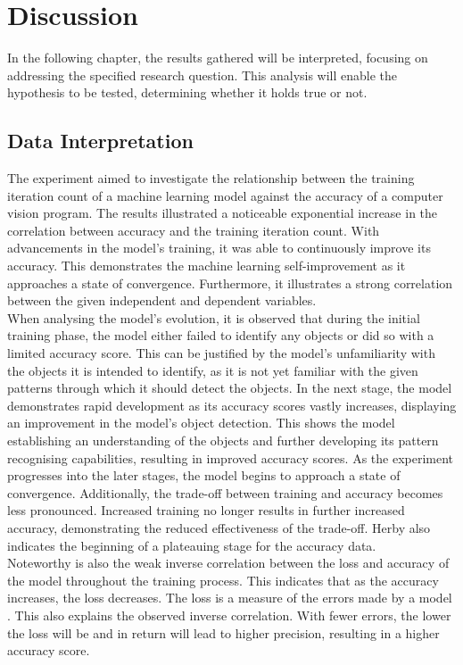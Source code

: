 \section{Discussion}
In the following chapter, the results gathered will be interpreted, focusing on addressing the specified research question. This analysis will enable the hypothesis to be tested, determining whether it holds true or not.

\subsection{Data Interpretation}

The experiment aimed to investigate the relationship between the training iteration count of a machine learning model against the accuracy of a computer vision program. The results illustrated a noticeable exponential increase in the correlation between accuracy and the training iteration count. With advancements in the model's training, it was able to continuously improve its accuracy. This demonstrates the machine learning self-improvement as it approaches a state of convergence. Furthermore, it illustrates a strong correlation between the given independent and dependent variables. \\

When analysing the model's evolution, it is observed that during the initial training phase, the model either failed to identify any objects or did so with a limited accuracy score. This can be justified by the model's unfamiliarity with the objects it is intended to identify, as it is not yet familiar with the given patterns through which it should detect the objects. In the next stage, the model demonstrates rapid development as its accuracy scores vastly increases, displaying an improvement in the model's object detection. This shows the model establishing an understanding of the objects and further developing its pattern recognising capabilities, resulting in improved accuracy scores. As the experiment progresses into the later stages, the model begins to approach a state of convergence. Additionally, the trade-off between training and accuracy becomes less pronounced. Increased training no longer results in further increased accuracy, demonstrating the reduced effectiveness of the trade-off. Herby also indicates the beginning of a plateauing stage for the accuracy data.  \\ 

Noteworthy is also the weak inverse correlation between the loss and accuracy of the model throughout the training process. This indicates that as the accuracy increases, the loss decreases. The loss is a measure of the errors made by a model \parencite{Baeldung2022}. This also explains the observed inverse correlation. With fewer errors, the lower the loss will be and in return will lead to higher precision, resulting in a higher accuracy score. \\


